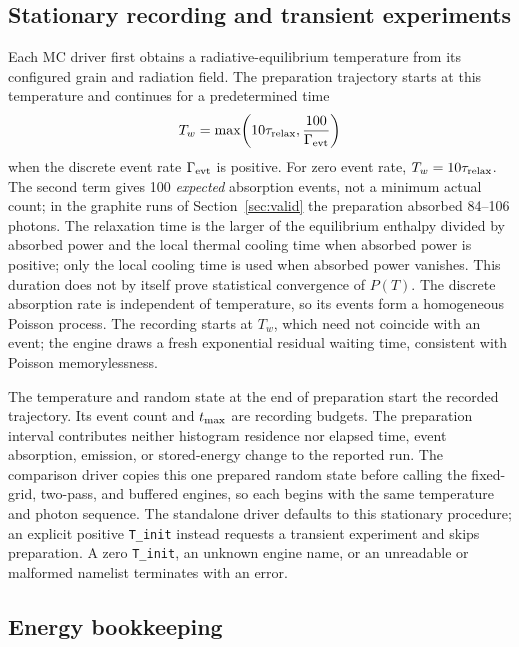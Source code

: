 \documentclass{my_memo}
\begin{document}
\subsection{Stationary recording and transient experiments}

Each MC driver first obtains a radiative-equilibrium temperature
from its configured grain and radiation field. The preparation trajectory
starts at this temperature and continues for a predetermined time
\begin{equation}
T_w = \max\!\left(10\tau_{\rm relax},\frac{100}{\Gamma_{\rm evt}}\right)
\end{equation}
when the discrete event rate $\Gamma_{\rm evt}$ is positive. For zero
event rate, $T_w=10\tau_{\rm relax}$. The second term gives 100
\emph{expected} absorption events, not a minimum actual count; in the
graphite runs of Section~\ref{sec:valid} the preparation absorbed
84--106 photons. The relaxation time is the larger of the equilibrium
enthalpy divided by absorbed power and the local thermal cooling time
when absorbed power is positive; only the local cooling time is used
when absorbed power vanishes. This duration does not by itself prove
statistical convergence of $P(T)$.
The discrete absorption rate is independent of temperature, so its
events form a homogeneous Poisson process. The recording starts at
$T_w$, which need not coincide with an event; the engine draws a fresh
exponential residual waiting time, consistent with Poisson
memorylessness.

The temperature and random state at the end of preparation start the
recorded trajectory. Its event count and $t_{\rm max}$ are recording
budgets. The preparation interval contributes neither histogram
residence nor elapsed time, event absorption, emission, or stored-energy
change to the reported run. The comparison driver copies this one
prepared random state before calling the fixed-grid, two-pass, and
buffered engines, so each begins with the same temperature and photon
sequence. The standalone driver defaults to this stationary procedure;
an explicit positive \verb|T_init| instead requests a transient
experiment and skips preparation. A zero \verb|T_init|, an unknown
engine name, or an unreadable or malformed namelist terminates with an
error.

\subsection{Energy bookkeeping}\label{sec:energy}
\end{document}
